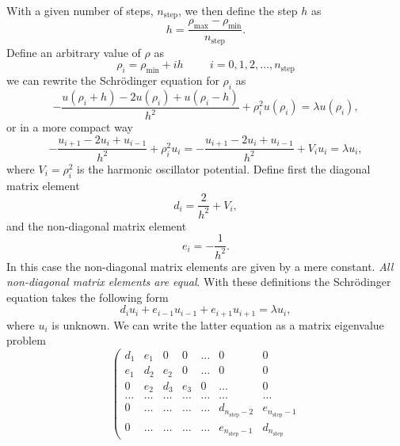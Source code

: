 \begin{prob}
With a given number of steps, $n_{\mathrm{step}}$, we then 
define the step $h$ as
\[
  h=\frac{\rho_{\mathrm{max}}-\rho_{\mathrm{min}} }{n_{\mathrm{step}}}.
\]
Define an arbitrary value of $\rho$ as 
\[
    \rho_i= \rho_{\mathrm{min}} + ih \hspace{1cm} i=0,1,2,\dots , n_{\mathrm{step}}
\]
we can rewrite the Schr\"odinger equation for $\rho_i$ as
\[
-\frac{u(\rho_i+h) -2u(\rho_i) +u(\rho_i-h)}{h^2}+\rho_i^2u(\rho_i)  = \lambda u(\rho_i),
\]
or in  a more compact way
\[
-\frac{u_{i+1} -2u_i +u_{i-1}}{h^2}+\rho_i^2u_i=-\frac{u_{i+1} -2u_i +u_{i-1} }{h^2}+V_iu_i  = \lambda u_i,
\]
where $V_i=\rho_i^2$ is the harmonic oscillator potential.
Define first the diagonal matrix element
\[
   d_i=\frac{2}{h^2}+V_i,
\]
and the non-diagonal matrix element 
\[
   e_i=-\frac{1}{h^2}.
\]
In this case the non-diagonal matrix elements are given by a mere constant.
{\em All non-diagonal matrix elements are equal}.
With these definitions the Schr\"odinger equation takes the following form
\[
d_iu_i+e_{i-1}u_{i-1}+e_{i+1}u_{i+1}  = \lambda u_i,
\]
where $u_i$ is unknown. We can write the 
latter equation as a matrix eigenvalue problem 
\begin{equation}
    \left( \begin{array}{ccccccc} d_1 & e_1 & 0   & 0    & \dots  &0     & 0 \\
                                e_1 & d_2 & e_2 & 0    & \dots  &0     &0 \\
                                0   & e_2 & d_3 & e_3  &0       &\dots & 0\\
                                \dots  & \dots & \dots & \dots  &\dots      &\dots & \dots\\
                                0   & \dots & \dots & \dots  &\dots       &d_{n_{\mathrm{step}}-2} & e_{n_{\mathrm{step}}-1}\\
                                0   & \dots & \dots & \dots  &\dots       &e_{n_{\mathrm{step}}-1} & d_{n_{\mathrm{step}}}


\end{array}
\end{equation}
\end{prob}
